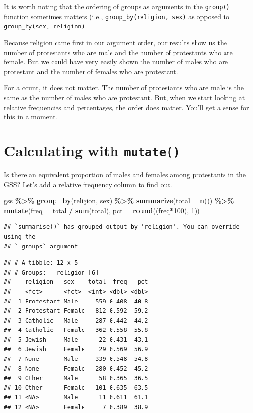 \documentclass[
]{book}
\newenvironment{Shaded}{\begin{snugshade}}{\end{snugshade}}
\newcommand{\AttributeTok}[1]{\textcolor[rgb]{0.13,0.29,0.53}{#1}}
\newcommand{\DecValTok}[1]{\textcolor[rgb]{0.00,0.00,0.81}{#1}}
\newcommand{\FunctionTok}[1]{\textcolor[rgb]{0.13,0.29,0.53}{\textbf{#1}}}
\newcommand{\NormalTok}[1]{#1}
\newcommand{\SpecialCharTok}[1]{\textcolor[rgb]{0.81,0.36,0.00}{\textbf{#1}}}
\begin{document}
It is worth noting that the ordering of groups as arguments in the \texttt{group()} function sometimes matters (i.e., \texttt{group\_by(religion,\ sex)} as opposed to \texttt{group\_by(sex,\ religion)}.

Because religion came first in our argument order, our results show us the number of protestants who are male and the number of protestants who are female. But we could have very easily shown the number of males who are protestant and the number of females who are protestant.

For a count, it does not matter. The number of protestants who are male is the same as the number of males who are protestant. But, when we start looking at relative frequencies and percentages, the order does matter. You'll get a sense for this in a moment.

\hypertarget{calculating-with-mutate}{%
\section{\texorpdfstring{Calculating with \texttt{mutate()}}{Calculating with mutate()}}\label{calculating-with-mutate}}

Is there an equivalent proportion of males and females among protestants in the GSS? Let's add a relative frequency column to find out.

\begin{Shaded}
\begin{Highlighting}[]
\NormalTok{gss }\SpecialCharTok{\%\textgreater{}\%}
  \FunctionTok{group\_by}\NormalTok{(religion, sex) }\SpecialCharTok{\%\textgreater{}\%}
  \FunctionTok{summarize}\NormalTok{(}\AttributeTok{total =} \FunctionTok{n}\NormalTok{()) }\SpecialCharTok{\%\textgreater{}\%}
  \FunctionTok{mutate}\NormalTok{(}\AttributeTok{freq =}\NormalTok{ total }\SpecialCharTok{/} \FunctionTok{sum}\NormalTok{(total),}
         \AttributeTok{pct =} \FunctionTok{round}\NormalTok{((freq}\SpecialCharTok{*}\DecValTok{100}\NormalTok{), }\DecValTok{1}\NormalTok{))}
\end{Highlighting}
\end{Shaded}

\begin{verbatim}
## `summarise()` has grouped output by 'religion'. You can override using the
## `.groups` argument.
\end{verbatim}

\begin{verbatim}
## # A tibble: 12 x 5
## # Groups:   religion [6]
##    religion   sex    total  freq   pct
##    <fct>      <fct>  <int> <dbl> <dbl>
##  1 Protestant Male     559 0.408  40.8
##  2 Protestant Female   812 0.592  59.2
##  3 Catholic   Male     287 0.442  44.2
##  4 Catholic   Female   362 0.558  55.8
##  5 Jewish     Male      22 0.431  43.1
##  6 Jewish     Female    29 0.569  56.9
##  7 None       Male     339 0.548  54.8
##  8 None       Female   280 0.452  45.2
##  9 Other      Male      58 0.365  36.5
## 10 Other      Female   101 0.635  63.5
## 11 <NA>       Male      11 0.611  61.1
## 12 <NA>       Female     7 0.389  38.9
\end{verbatim}
\end{document}
